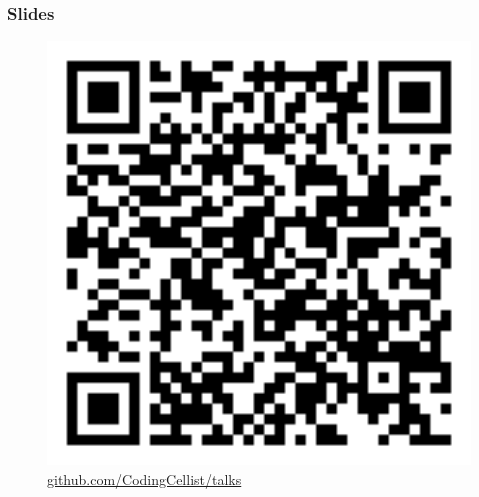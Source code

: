 \documentclass[compress,handout]{beamer}
\begin{document}
\begin{frame}
  \frametitle{Slides}

  \begin{center}
    \begin{figure}
      \includegraphics[width=0.35\framewidth]{qr-code.png}
      \caption{\href{https://github.com/CodingCellist/talks/tree/main/2024-03-06-spls-st-andrews}{github.com/CodingCellist/talks}}
    \end{figure}
  \end{center}

\end{frame}
\end{document}
